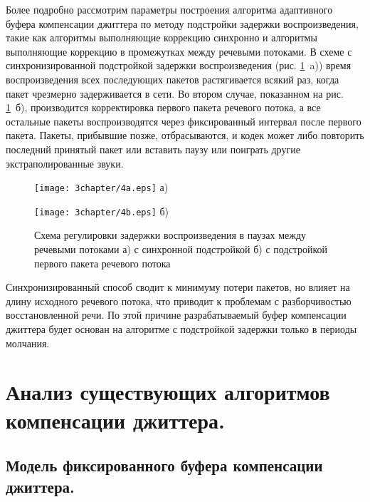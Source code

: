 Более подробно рассмотрим параметры построения алгоритма адаптивного буфера компенсации джиттера по методу подстройки задержки воспроизведения, такие как алгоритмы выполняющие коррекцию синхронно и алгоритмы выполняющие коррекцию в промежутках между речевыми потоками. 
В схеме с синхронизированной подстройкой задержки воспроизведения (рис. \ref{img3:manageDelay} a)) время воспроизведения всех последующих пакетов растягивается всякий раз, когда пакет чрезмерно задерживается в сети. 
Во втором случае, показанном на рис. \ref{img3:manageDelay} б), производится корректировка первого пакета речевого потока, а все остальные пакеты воспроизводятся через фиксированный интервал после первого пакета. Пакеты, прибывшие позже, отбрасываются, и кодек может либо повторить последний принятый пакет или вставить паузу или поиграть другие экстраполированные звуки.


\begin{figure} [h]
\begin{minipage}[h]{0.85\linewidth}
\center
\texttt{[image: 3chapter/4a.eps]} а) \\
\end{minipage}
\vfill
\begin{minipage}[h]{0.95\linewidth}
\center
\texttt{[image: 3chapter/4b.eps]} б) \\
\end{minipage}
\caption{Схема регулировки задержки воспроизведения в паузах между речевыми потоками а) с синхронной подстройкой б) с подстройкой первого пакета речевого потока }
\label{img3:manageDelay}
\end{figure}


Синхронизированный способ сводит к минимуму потери пакетов, но влияет на длину исходного речевого потока, что приводит к проблемам с разборчивостью восстановленной речи. По этой причине разрабатываемый буфер компенсации джиттера будет основан на алгоритме с подстройкой задержки только в периоды молчания.


\section{Анализ существующих алгоритмов компенсации джиттера.} \label{sect3_4}
\subsection{Модель фиксированного буфера компенсации джиттера.} \label{sect3_4_1}

